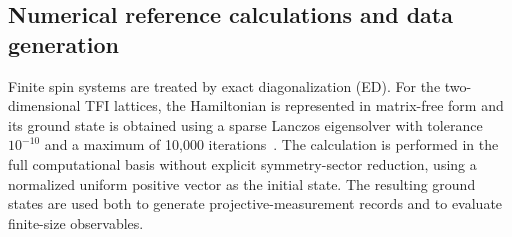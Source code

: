 \documentclass[11pt,a4paper]{article}
\newcommand{\TBD}[1]{\textcolor{red!70!black}{\textsf{[TBD: #1]}}}
\newcommand{\subhead}[1]{\subsection*{#1}}
\begin{document}

\subhead{Numerical reference calculations and data generation}

Finite spin systems are treated by exact diagonalization (ED).
For the two-dimensional TFI lattices, the Hamiltonian is represented in matrix-free form and its ground state is obtained using a sparse Lanczos eigensolver with tolerance $10^{-10}$
and a maximum of 10,000 iterations~\cite{lanczos1950iteration}.
The calculation is performed in the full computational basis without
explicit symmetry-sector reduction, using a normalized uniform
positive vector as the initial state. The resulting ground states are
used both to generate projective-measurement records and to evaluate
finite-size observables.
\end{document}
